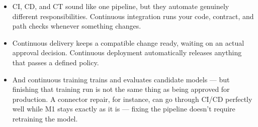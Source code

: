 \documentclass[11pt,a4paper]{article}
\begin{document}
\begin{examplebox}[title after break={SPOKEN SCRIPT --- slide 35 continued}]
\begin{itemize}
\item CI, CD, and CT sound like one pipeline, but they automate genuinely different responsibilities. Continuous integration runs your code, contract, and path checks whenever something changes.
\item Continuous delivery keeps a compatible change ready, waiting on an actual approval decision. Continuous deployment automatically releases anything that passes a defined policy.
\item And continuous training trains and evaluates candidate models — but finishing that training run is not the same thing as being approved for production. A connector repair, for instance, can go through CI/CD perfectly well while M1 stays exactly as it is — fixing the pipeline doesn't require retraining the model.
\end{itemize}
\end{examplebox}
\par\noindent{\scriptsize\textcolor{teal!60!black}{Reading anchor: Bass, §14.1 · Kalinowski, §16.3–16.5 (supporting)}}
\clearpage
\end{document}
